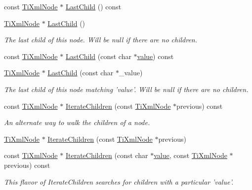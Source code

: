 \begin{DoxyCompactItemize}
const \hyperlink{classTiXmlNode}{TiXmlNode} $\ast$ \hyperlink{classTiXmlNode_a6d671107e00cca1d28cb2d7f3a87a21e}{LastChild} () const 
\item 
\hyperlink{classTiXmlNode}{TiXmlNode} $\ast$ \hyperlink{classTiXmlNode_a6432d2b2495f6caf9cb4278df706a031}{LastChild} ()
\begin{DoxyCompactList}\small\item\em The last child of this node. Will be null if there are no children. \item\end{DoxyCompactList}\item 
const \hyperlink{classTiXmlNode}{TiXmlNode} $\ast$ \hyperlink{classTiXmlNode_acdd3fdc436aa7433023310a041e5e63f}{LastChild} (const char $\ast$\hyperlink{classTiXmlNode_aead528b3cedc33c16a6c539872c7cc8b}{value}) const 
\item 
\hyperlink{classTiXmlNode}{TiXmlNode} $\ast$ \hyperlink{classTiXmlNode_abad5bf1059c48127b958711ef89e8e5d}{LastChild} (const char $\ast$\_\-value)
\begin{DoxyCompactList}\small\item\em The last child of this node matching 'value'. Will be null if there are no children. \item\end{DoxyCompactList}\item 
const \hyperlink{classTiXmlNode}{TiXmlNode} $\ast$ \hyperlink{classTiXmlNode_aaef7ac3978c4bb1cc8a24ffae7bced75}{IterateChildren} (const \hyperlink{classTiXmlNode}{TiXmlNode} $\ast$previous) const 
\begin{DoxyCompactList}\small\item\em An alternate way to walk the children of a node. \item\end{DoxyCompactList}\item 
\hyperlink{classTiXmlNode}{TiXmlNode} $\ast$ \hyperlink{classTiXmlNode_a2358e747118fdbf0e467b1e4f7d03de1}{IterateChildren} (const \hyperlink{classTiXmlNode}{TiXmlNode} $\ast$previous)
\item 
const \hyperlink{classTiXmlNode}{TiXmlNode} $\ast$ \hyperlink{classTiXmlNode_af2b86dbe25d3d26fa48180edc5e2a9fc}{IterateChildren} (const char $\ast$\hyperlink{classTiXmlNode_aead528b3cedc33c16a6c539872c7cc8b}{value}, const \hyperlink{classTiXmlNode}{TiXmlNode} $\ast$previous) const 
\begin{DoxyCompactList}\small\item\em This flavor of IterateChildren searches for children with a particular 'value'. \item\end{DoxyCompactList}\item 

\end{DoxyCompactItemize}

